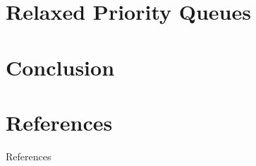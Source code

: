 \documentclass{beamer}
\begin{document}
\section{Relaxed Priority Queues}

\section{Conclusion}

\section{References}

\begin{frame}[allowframebreaks]{References}
\printbibliography
\end{frame}
\end{document}
